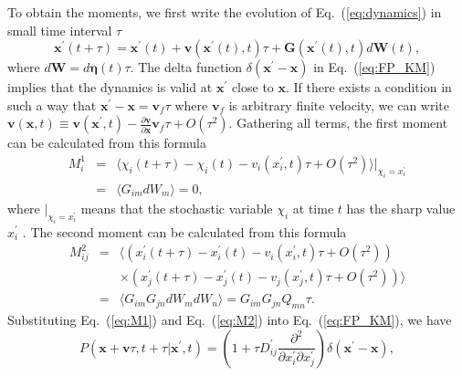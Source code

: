 \documentclass[aps,pre,reprint,superscriptaddress,showpacs,amsmath
,floatfix
]{revtex4-2}
\renewcommand{\vec}[1]{\boldsymbol{#1}}
\newcommand{\mat}[1]{\textbf{#1}}
\newcommand{\eq}[1]{Eq.~(\ref{#1})}
\newcommand{\Order}[1]{O(#1)}
\begin{document}
To obtain the moments, we first write the evolution of \eq{eq:dynamics} in small time interval $\tau$
\begin{equation}
\label{eq:moments_1}
\vec{x}^\prime(t+\tau) = \vec{x}^\prime(t) + \vec{v}(\vec{x}^\prime(t),t)\tau + \mat{G}(\vec{x}^\prime(t),t)d\vec{W}(t) ,
\end{equation}
where $d\vec{W} = d\vec{\eta}(t)\tau$. The delta function $\delta(\vec{x}^\prime - \vec{x})$ in \eq{eq:FP_KM} implies that the dynamics is valid at $\vec{x}^\prime$ close to $\vec{x}$.  If there exists a condition in such a way that $\vec{x}^\prime - \vec{x} = \vec{v}_f\tau$ where $\vec{v}_f$ is arbitrary finite velocity, we can write $\vec{v}(\vec{x},t) \equiv \vec{v}(\vec{x}^\prime,t) - \frac{\partial \vec{v}}{\partial \vec{x}} \vec{v}_f\tau + \Order{\tau^2}$. 
Gathering all terms, the first moment can be calculated from this formula \cite{risken1996fokker}
\begin{eqnarray}
\label{eq:M1}
M_i^1 &=& \langle \chi_{i}(t+\tau)-\chi_{i}(t)-v_{i}(x_i^\prime,t)\tau + \Order{\tau^2} \rangle \vert_{\chi_i=x_i^\prime}  \nonumber\\
&=& \langle G_{im} dW_m \rangle = 0,
\end{eqnarray}
where $\vert_{\chi_i=x_i^\prime}$ means that the stochastic variable $\chi_i$ at time $t$ has the sharp value $x_i^\prime$ \cite{risken1996fokker}.
The second moment can be calculated from this formula \cite{risken1996fokker}
\begin{eqnarray}
\label{eq:M2}
M_{ij}^2 &=& \langle (x_{i}^\prime(t+\tau)-x_{i}^\prime(t)-v_{i}(x_i^\prime,t)\tau + \Order{\tau^2}) \nonumber\\
&& \times (x_{j}^\prime(t+\tau)-x_{j}^\prime(t)-v_{j}(x_j^\prime,t)\tau + \Order{\tau^2}) \rangle \nonumber\\
&=& \langle G_{im} G_{jn} dW_m dW_n \rangle = G_{im} G_{jn}Q_{mn} \tau .
\end{eqnarray}
Substituting \eq{eq:M1} and \eq{eq:M2} into \eq{eq:FP_KM}, we have
\begin{equation}
\label{eq:FP_KM_2}
P(\vec{x}+\vec{v}\tau,t+\tau|\vec{x}^\prime,t) 
=  \left(1 + \tau D_{ij}^\prime \frac{\partial^2 }{\partial x_{i}^\prime \partial x_{j}^\prime }  \right) \delta(\vec{x}^\prime - \vec{x}),
\end{equation}
\end{document}
